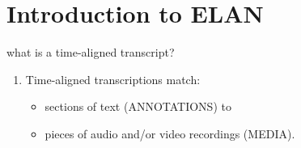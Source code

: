 \documentclass{beamer}
\begin{document}
    \section{Introduction to ELAN}
    \begin{frame}{what is a time-aligned transcript?}
      \begin{enumerate}
      \item<2-> Time-aligned transcriptions match:
        \begin{itemize}
        \item<3-> sections of text (ANNOTATIONS) to
        \item<4-> pieces of audio and/or video recordings (MEDIA).
        \end{itemize} 
      \end{enumerate}
    \end{frame}
\end{document}
